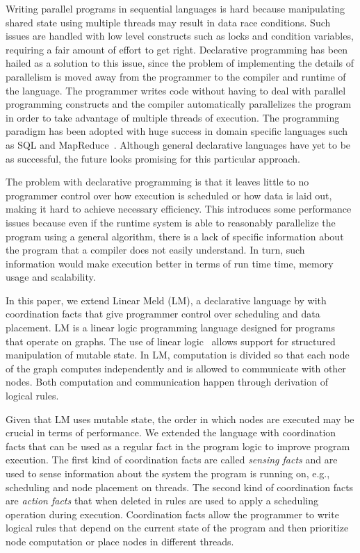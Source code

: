 Writing parallel programs in sequential languages is hard because manipulating
shared state using multiple threads may result in data race
conditions. Such issues are handled with low level constructs such as locks and
condition variables, requiring a fair amount of effort to get right.
Declarative programming has been hailed as a solution to this issue, since the
problem of implementing the details of parallelism is moved away from the programmer to the
compiler and runtime of the language. The programmer writes code
without having to deal with parallel programming constructs and the compiler
automatically parallelizes the program in order to take advantage of
multiple threads of execution.
The programming paradigm has been adopted with huge success in domain specific
languages such as SQL and MapReduce~\cite{Dean:2008:MSD:1327452.1327492}.
Although general declarative languages have yet to be as successful, the
future looks promising for this particular approach.

The problem with declarative programming is that it leaves little to no programmer control
over how execution is scheduled or how data is laid out, making it hard to achieve
necessary efficiency. This introduces some
performance issues because even if the runtime system is able to reasonably
parallelize the program using a general algorithm, there is a lack of specific
information about the program that a compiler does not easily understand. In
turn, such information would make execution better in terms of run time time,
memory usage and scalability.

In this paper, we extend Linear Meld (LM), a declarative language by
\cite{cruz-iclp14,cruz-ppdp14} with coordination facts that give programmer
control over scheduling and data placement. LM is a linear logic programming
language designed for programs that operate on graphs.  The use of linear
logic~\cite{girard-87} allows support for structured manipulation of mutable
state. In LM, computation is divided so that each node of the graph computes
independently and is allowed to communicate with other nodes.
Both computation and communication happen through derivation of logical rules.

Given that LM uses mutable state, the order in which nodes are executed may be
crucial in terms of performance. We extended the language with coordination
facts that can be used as a regular fact in the program logic to improve program
execution.  The first kind of coordination facts are called \emph{sensing facts}
and are used to sense information about the system the program is running on,
e.g., scheduling and node placement on threads. The second kind of coordination facts are
\emph{action facts} that when deleted in rules are used to apply a scheduling
operation during execution. Coordination facts allow the programmer to write
logical rules that depend on the current state of the program and then prioritize node
computation or place nodes in different threads.

